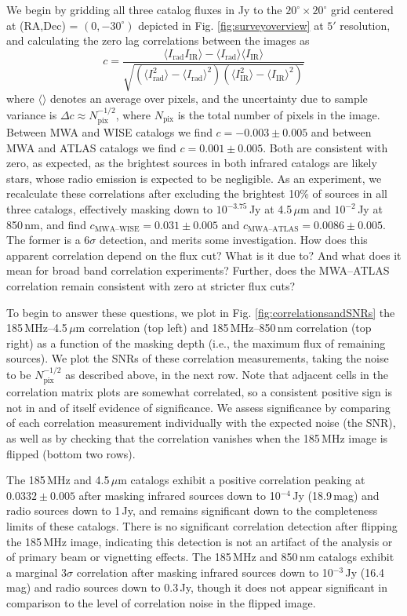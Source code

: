 \documentclass[numberedappendix]{emulateapj}
\newcommand{\rad}{\text{rad}}
\newcommand{\IR}{\text{IR}}
\begin{document}
We begin by gridding all three catalog fluxes in Jy to the $20^\circ\times20^\circ$ grid centered at (RA,Dec) = $(0, -30^\circ)$ depicted in Fig. \ref{fig:surveyoverview} at $5'$ resolution, and calculating the zero lag correlations between the images as
\begin{equation}
\label{eqn:imagecorrdef}
	c = \frac{\langle I_\rad I_\IR\rangle-\langle I_\rad\rangle\langle I_\IR\rangle}{\sqrt{(\langle I_\rad^2\rangle -\langle I_\rad\rangle^2)(\langle I_\IR^2\rangle -\langle I_\IR\rangle^2)}}
\end{equation}
where $\langle\rangle$ denotes an average over pixels, and the uncertainty due to sample variance is $\Delta c\approx N_\text{pix}^{-1/2}$, where $N_\text{pix}$ is the total number of pixels in the image. Between MWA and WISE catalogs we find $c=-0.003\pm0.005$ and between MWA and ATLAS catalogs we find $c=0.001\pm0.005$. Both are consistent with zero, as expected, as the brightest sources in both infrared catalogs are likely stars, whose radio emission is expected to be negligible. As an experiment, we recalculate these correlations after excluding the brightest 10\% of sources in all three catalogs, effectively masking down to $10^{-3.75}$\,Jy at 4.5\,$\mu$m and $10^{-2}$\,Jy at 850\,nm, and find $c_\text{MWA--WISE}=0.031\pm0.005$ and $c_\text{MWA--ATLAS}=0.0086\pm0.005$. The former is a $6\sigma$ detection, and merits some investigation. How does this apparent correlation depend on the flux cut? What is it due to? And what does it mean for broad band correlation experiments? Further, does the MWA--ATLAS correlation remain consistent with zero at stricter flux cuts?

To begin to answer these questions, we plot in Fig. \ref{fig:correlationsandSNRs} the 185\,MHz--4.5\,$\mu$m correlation (top left) and 185\,MHz--850\,nm correlation (top right) as a function of the masking depth (i.e., the maximum flux of remaining sources). We plot the SNRs of these correlation measurements, taking the noise to be $N_\text{pix}^{-1/2}$ as described above, in the next row. Note that adjacent cells in the correlation matrix plots are somewhat correlated, so a consistent positive sign is not in and of itself evidence of significance. We assess significance by comparing of each correlation measurement individually with the expected noise (the SNR), as well as by checking that the correlation vanishes when the 185\,MHz image is flipped (bottom two rows). 

The 185\,MHz and 4.5\,$\mu$m catalogs exhibit a positive correlation peaking at $0.0332\pm0.005$ after masking infrared sources down to 10$^{-4}$\,Jy (18.9\,mag) and radio sources down to 1\,Jy, and remains significant down to the completeness limits of these catalogs. There is no significant correlation detection after flipping the 185\,MHz image, indicating this detection is not an artifact of the analysis or of primary beam or vignetting effects. The 185\,MHz and 850\,nm catalogs exhibit a marginal $3\sigma$ correlation after masking infrared sources down to 10$^{-3}$\,Jy (16.4\,mag) and radio sources down to 0.3\,Jy, though it does not appear significant in comparison to the level of correlation noise in the flipped image.
\end{document}
